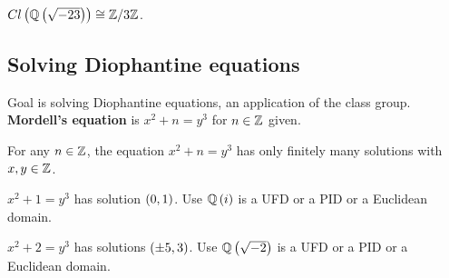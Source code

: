 \begin{example*}
$ Cl\left( \mathbb{Q}\left( \sqrt{-23} \right) \right) \cong \mathbb{Z} / 3\mathbb{Z} $.
\end{example*}

\pagebreak

\subsection{Solving Diophantine equations}


Goal is solving Diophantine equations, an application of the class group. \textbf{Mordell's equation} is $ x^2 + n = y^3 $ for $ n \in \mathbb{Z} $ given.

\begin{theorem}
For any $ n \in \mathbb{Z} $, the equation $ x^2 + n = y^3 $ has only finitely many solutions with $ x, y \in \mathbb{Z} $.
\end{theorem}

\begin{example*}
$ x^2 + 1 = y^3 $ has solution $ \left( 0, 1 \right) $. Use $ \mathbb{Q}\left( i \right) $ is a UFD or a PID or a Euclidean domain.
\end{example*}

\begin{example*}
$ x^2 + 2 = y^3 $ has solutions $ \left( \pm 5, 3 \right) $. Use $ \mathbb{Q}\left( \sqrt{-2} \right) $ is a UFD or a PID or a Euclidean domain.
\end{example*}

